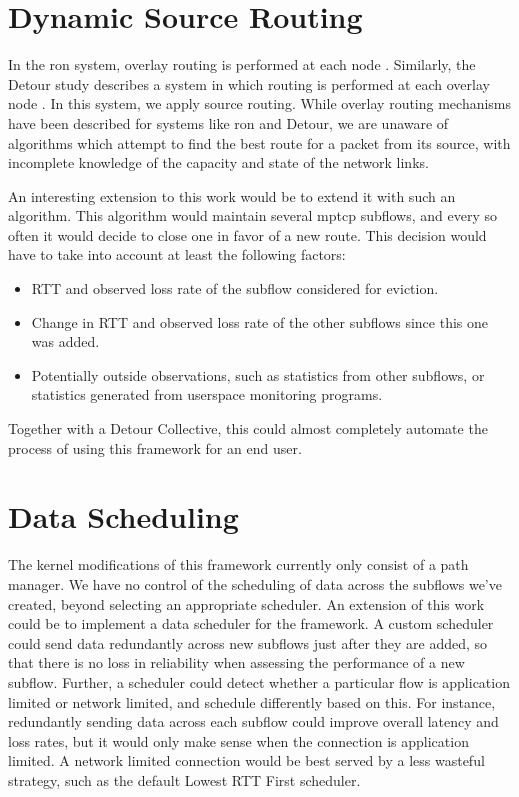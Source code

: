 \documentclass{cwru}
\begin{document}
\section{Dynamic Source Routing}

In the \ac{ron} system, overlay routing is performed at each node \cite{ron}.
Similarly, the Detour study describes a system in which routing is performed at
each overlay node \cite{detour}. In this system, we apply source routing. While
overlay routing mechanisms have been described for systems like \ac{ron} and
Detour, we are unaware of algorithms which attempt to find the best route for a
packet from its source, with incomplete knowledge of the capacity and state of
the network links.

An interesting extension to this work would be to extend it with such an
algorithm. This algorithm would maintain several \ac{mptcp} subflows, and every
so often it would decide to close one in favor of a new route. This decision
would have to take into account at least the following factors:

\begin{itemize}
\item RTT and observed loss rate of the subflow considered for eviction.
\item Change in RTT and observed loss rate of the other subflows since this one
  was added.
\item Potentially outside observations, such as statistics from other subflows,
  or statistics generated from userspace monitoring programs.
\end{itemize}

Together with a Detour Collective, this could almost completely automate the
process of using this framework for an end user.

\section{Data Scheduling}

The kernel modifications of this framework currently only consist of a path
manager. We have no control of the scheduling of data across the subflows we've
created, beyond selecting an appropriate scheduler. An extension of this work
could be to implement a data scheduler for the framework. A custom scheduler
could send data redundantly across new subflows just after they are added, so
that there is no loss in reliability when assessing the performance of a new
subflow. Further, a scheduler could detect whether a particular flow is
application limited or network limited, and schedule differently based on this.
For instance, redundantly sending data across each subflow could improve overall
latency and loss rates, but it would only make sense when the connection is
application limited. A network limited connection would be best served by a less
wasteful strategy, such as the default Lowest RTT First scheduler.
\end{document}
